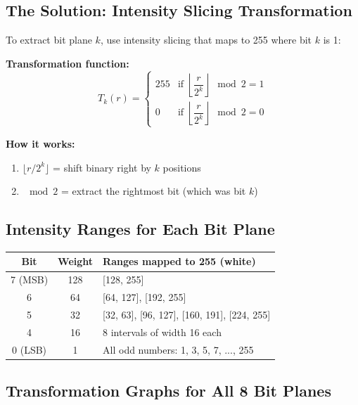 \documentclass[12pt,a4paper]{article}
\begin{document}
\subsection{The Solution: Intensity Slicing Transformation}

\begin{keypoint}
To extract bit plane $k$, use intensity slicing that maps to 255 where bit $k$ is 1:

\textbf{Transformation function:}
\[
T_k(r) = \begin{cases}
255 & \text{if } \left\lfloor \dfrac{r}{2^k} \right\rfloor \mod 2 = 1\\[0.8em]
0 & \text{if } \left\lfloor \dfrac{r}{2^k} \right\rfloor \mod 2 = 0
\end{cases}
\]

\textbf{How it works:}
\begin{enumerate}
    \item $\lfloor r/2^k \rfloor$ = shift binary right by $k$ positions
    \item $\mod 2$ = extract the rightmost bit (which was bit $k$)
\end{enumerate}
\end{keypoint}

\subsection{Intensity Ranges for Each Bit Plane}

\begin{center}
\renewcommand{\arraystretch}{1.2}
\begin{tabular}{|c|c|p{8cm}|}
\hline
\textbf{Bit} & \textbf{Weight} & \textbf{Ranges mapped to 255 (white)} \\
\hline
7 (MSB) & 128 & [128, 255] \\
6 & 64 & [64, 127], [192, 255] \\
5 & 32 & [32, 63], [96, 127], [160, 191], [224, 255] \\
4 & 16 & 8 intervals of width 16 each \\
0 (LSB) & 1 & All odd numbers: 1, 3, 5, 7, ..., 255 \\
\hline
\end{tabular}
\end{center}

\subsection{Transformation Graphs for All 8 Bit Planes}
\end{document}

